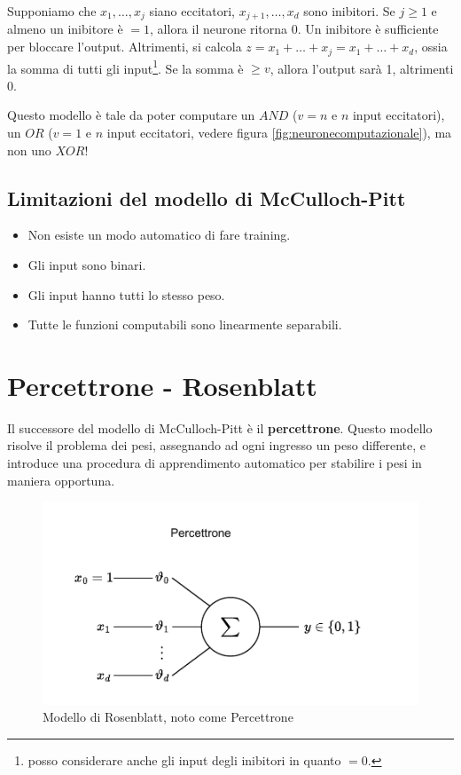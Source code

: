 Supponiamo che $x_1, \dots, x_j$ siano eccitatori, $x_{j+1}, \dots, x_d$ sono inibitori. Se $j \geq 1$ e almeno un inibitore è $=1$, allora il neurone ritorna 0. Un inibitore è sufficiente per bloccare l'output. Altrimenti, si calcola $z = x_1 + \dots + x_j = x_1 + \dots + x_d$, ossia la somma di tutti gli input\footnote{posso considerare anche gli input degli inibitori in quanto $=0$.}. Se la somma è $\geq v$, allora l'output sarà 1, altrimenti 0.

Questo modello è tale da poter computare un $AND$ ($v=n$ e $n$ input eccitatori), un $OR$ ($v=1$ e $n$ input eccitatori, vedere figura \ref{fig:neuronecomputazionale}), ma non uno $XOR$!

\subsection{Limitazioni del modello di McCulloch-Pitt}
\begin{itemize}
	\item Non esiste un modo automatico di fare training.
	\item Gli input sono binari.
	\item Gli input hanno tutti lo stesso peso.
	\item Tutte le funzioni computabili sono linearmente separabili.
\end{itemize}

\section{Percettrone - Rosenblatt}

Il successore del modello di McCulloch-Pitt è il \textbf{percettrone}. Questo modello risolve il problema dei pesi, assegnando ad ogni ingresso un peso differente, e introduce una procedura di apprendimento automatico per stabilire i pesi in maniera opportuna.
\begin{figure}[tbph]
	\centering
	\includegraphics[width=\linewidth]{./images/percettrone.pdf}
	\caption{Modello di Rosenblatt, noto come Percettrone}
	\label{fig:percettrone}
\end{figure}

